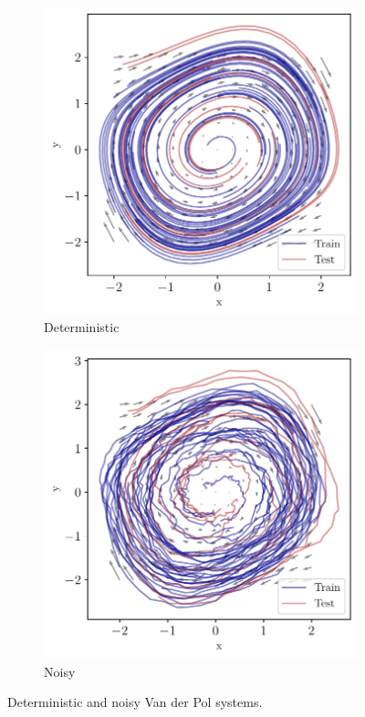 \documentclass{article}
\theoremstyle{definition} \newtheorem{definition}{Definition}  \newtheorem{example}{Example}
\theoremstyle{remark} \newtheorem{remark}{Remark}
\begin{document}
\begin{figure}[htbp]
    \centering
    \begin{subfigure}[b]{0.48\linewidth}
        \centering
        \includegraphics[width=\linewidth]{vdp_vf_trajs}
        \caption{Deterministic}
        \label{fig:vdp_vf_trajs}
    \end{subfigure}
    \hfill
    \begin{subfigure}[b]{0.48\linewidth}
        \centering
        \includegraphics[width=\linewidth]{vdpnoisy_vf_trajs}
        \caption{Noisy}
        \label{fig:vdpnoisy_vf_trajs}
    \end{subfigure}
    \caption{Deterministic and noisy Van der Pol systems.}
    \label{fig:vdp}
\end{figure}
\end{document}
